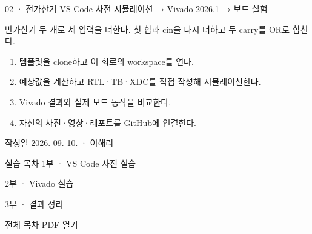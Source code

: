 
\renewcommand{\labonehome}{\hyperlink{modern-02-contents}{\contentsbutton}}
\renewcommand{\legacySource}[1]{}
\providecommand{\terminalbox}[1]{\par\vspace{0.15cm}{\setlength{\fboxsep}{7pt}\colorbox{black}{\parbox{\dimexpr\textwidth-14pt\relax}{\color{white}\ttfamily\fontsize{7}{9}\selectfont #1}}}\par\vspace{0.15cm}}

\begingroup
\renewcommand{\small}{\fontsize{9}{11}\selectfont}
\begin{frame}{02 · 전가산기}\relax
\small
VS Code 사전 시뮬레이션 → Vivado 2026.1 → 보드 실험\par\vspace{0.22cm}반가산기 두 개로 세 입력을 더한다. 첫 합과 cin을 다시 더하고 두 carry를 OR로 합친다.\par\begin{enumerate}\setlength{\itemsep}{0.22cm}
\item 템플릿을 clone하고 이 회로의 workspace를 연다.
\item 예상값을 계산하고 RTL·TB·XDC를 직접 작성해 시뮬레이션한다.
\item Vivado 결과와 실제 보드 동작을 비교한다.
\item 자신의 사진·영상·레포트를 GitHub에 연결한다.
\end{enumerate}
작성일 2026. 09. 10. · 이해리\par
\end{frame}

\begin{frame}[label=modern-02-contents]{실습 목차}\relax
\small
1부 · VS Code 사전 실습\par{}\par\vspace{0.2cm}
\par\vspace{0.4cm}
2부 · Vivado 실습\par{}\par\vspace{0.4cm}
3부 · 결과 정리\par{}\par\vspace{0.35cm}
\href{04.LAB1_00_CONTENTS.pdf}{전체 목차 PDF 열기}
\end{frame}

